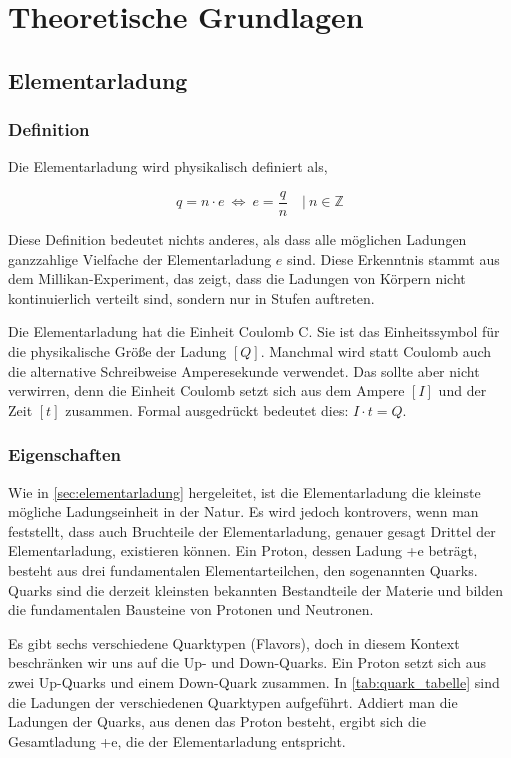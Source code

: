 \chapter{Theoretische Grundlagen}\label{ch:theorieGrundlagen}
\section{Elementarladung}\label{sec:elementarladung}
\subsection{Definition}\label{sub:definition}
Die Elementarladung wird physikalisch definiert als,

\begin{equation}\label{eq:definition}
 q  =  n \cdot e \:  \Leftrightarrow \: e = \frac{q}{n} \quad | \ n \in \mathbb{Z}
\end{equation}

\noindent Diese Definition bedeutet nichts anderes, als dass alle möglichen Ladungen ganzzahlige Vielfache der Elementarladung $e$ sind. Diese Erkenntnis stammt aus dem Millikan-Experiment, das zeigt, dass die Ladungen von Körpern nicht kontinuierlich verteilt sind, sondern nur in Stufen auftreten.

Die Elementarladung hat die Einheit Coulomb C. Sie ist das Einheitssymbol für die physikalische Größe der Ladung $[Q]$. Manchmal wird statt Coulomb auch die alternative Schreibweise Amperesekunde verwendet. Das sollte aber nicht verwirren, denn die Einheit Coulomb setzt sich aus dem Ampere $[I]$ und der Zeit $[t]$ zusammen. Formal ausgedrückt bedeutet dies: $I \cdot t = Q$. 

\subsection{Eigenschaften}\label{sub:eigenschaften}
Wie in \autoref{sec:elementarladung} hergeleitet, ist die Elementarladung die kleinste mögliche Ladungseinheit in der Natur. Es wird jedoch kontrovers, wenn man feststellt, dass auch Bruchteile der Elementarladung, genauer gesagt Drittel der Elementarladung, existieren können. Ein Proton, dessen Ladung +e beträgt, besteht aus drei fundamentalen Elementarteilchen, den sogenannten Quarks. Quarks sind die derzeit kleinsten bekannten Bestandteile der Materie und bilden die fundamentalen Bausteine von Protonen und Neutronen.

Es gibt sechs verschiedene Quarktypen (Flavors), doch in diesem Kontext beschränken wir uns auf die Up- und Down-Quarks. Ein Proton setzt sich aus zwei Up-Quarks und einem Down-Quark zusammen. In \autoref{tab:quark_tabelle} sind die Ladungen der verschiedenen Quarktypen aufgeführt. Addiert man die Ladungen der Quarks, aus denen das Proton besteht, ergibt sich die Gesamtladung +e, die der Elementarladung entspricht.

